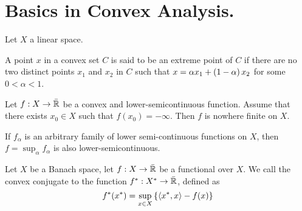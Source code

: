 \chapter{Basics in Convex Analysis.}

\begin{definition}[Convexity]
Let $X$ a linear space. 
\end{definition}
\begin{definition}
\end{definition}
\begin{definition}
\end{definition}
\begin{definition}
A point $x$ in a convex set $C$ is said to be an extreme point of $C$ if there are no two distinct points $x_1$ and $x_2$ in $C$ such that $x = \alpha x_1 + \left( 1-\alpha \right)x_2$ for some $0<\alpha <1$.
\end{definition}

\begin{proposition}
Let $f: X \rightarrow \bar{\mathbb{R}}$ be a convex and lower-semicontinuous function.
Assume that there exists $x_0 \in X$ such that $f(x_0) = -\infty$. Then $f$ is nowhere finite on $X$.
\end{proposition} 


\begin{theorem} If $ f_\alpha $ is an arbitrary family of lower semi-continuous functions on $X$, then $f=\sup_\alpha f_\alpha$ is also lower-semicontinuous.
\end{theorem}


\begin{definition}
Let $X$ be a Banach space, let $f:X\rightarrow \bar{\mathbb{R}}$ be a functional over $X$. We call the convex conjugate to the function ${f}^*: {X}^*\rightarrow \bar{\mathbb{R}}$, defined as
\begin{equation*}
	{f}^*({x}^*)=\sup_{x\in X} \left\lbrace \left\langle {x}^*, x \right\rangle-f(x) \right\rbrace
\end{equation*}	
\end{definition}

